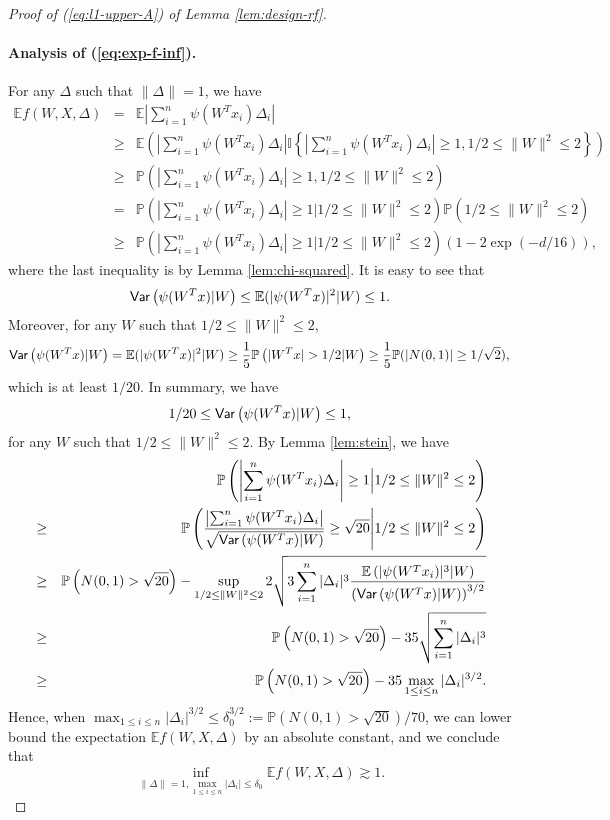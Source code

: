 \begin{proof}[Proof of (\ref{eq:l1-upper-A}) of Lemma \ref{lem:design-rf}]
\paragraph{Analysis of (\ref{eq:exp-f-inf}).} For any $\Delta$ such that $\|\Delta\|=1$, we have
\begin{eqnarray}
\nonumber \mathbb{E}f(W,X,\Delta) &=& \mathbb{E}\left|\sum_{i=1}^n\psi(W^Tx_i)\Delta_i\right| \\
\nonumber &\geq& \mathbb{E}\left(\left|\sum_{i=1}^n\psi(W^Tx_i)\Delta_i\right|\mathbb{I}\left\{\left|\sum_{i=1}^n\psi(W^Tx_i)\Delta_i\right|\geq 1, 1/2\leq \|W\|^2\leq 2\right\}\right) \\
\nonumber &\geq& \mathbb{P}\left(\left|\sum_{i=1}^n\psi(W^Tx_i)\Delta_i\right|\geq 1, 1/2\leq \|W\|^2\leq 2\right) \\
\nonumber &=& \mathbb{P}\left(\left|\sum_{i=1}^n\psi(W^Tx_i)\Delta_i\right|\geq 1\Big|1/2\leq \|W\|^2\leq 2\right)\mathbb{P}\left(1/2\leq \|W\|^2\leq 2\right) \\
\nonumber &\geq& \mathbb{P}\left(\left|\sum_{i=1}^n\psi(W^Tx_i)\Delta_i\right|\geq 1\Big|1/2\leq \|W\|^2\leq 2\right)\left(1-2\exp(-d/16)\right),
\end{eqnarray}
where the last inequality is by Lemma \ref{lem:chi-squared}. It is easy to see that $$\textsf{Var}\left(\psi(W^Tx)|W\right)\leq \mathbb{E}(|\psi(W^Tx)|^2|W)\leq 1.$$
Moreover, for any $W$ such that $1/2\leq \|W\|^2\leq 2$,
$$\Var\left(\psi(W^Tx)|W\right)= \mathbb{E}(|\psi(W^Tx)|^2|W) \geq \frac{1}{5}\mathbb{P}\left(|W^Tx|>1/2|W\right)\geq \frac{1}{5}\mathbb{P}(|N(0,1)|\geq 1/\sqrt{2}),$$
which is at least $1/20$. In summary, we have
$$1/20 \leq \textsf{Var}\left(\psi(W^Tx)|W\right) \leq 1,$$
for any $W$ such that $1/2\leq \|W\|^2\leq 2$.
By Lemma \ref{lem:stein}, we have
\begin{eqnarray}
\nonumber && \mathbb{P}\left(\left|\sum_{i=1}^n\psi(W^Tx_i)\Delta_i\right|\geq 1\Big|1/2\leq \|W\|^2\leq 2\right) \\
\nonumber &\geq& \mathbb{P}\left(\frac{\left|\sum_{i=1}^n\psi(W^Tx_i)\Delta_i\right|}{\sqrt{\Var\left(\psi(W^Tx)|W\right)}}\geq \sqrt{20}\Bigg|1/2\leq \|W\|^2\leq 2\right) \\
\nonumber &\geq& \mathbb{P}\left(N(0,1)>\sqrt{20}\right) - \sup_{1/2\leq \|W\|^2\leq 2} 2\sqrt{3\sum_{i=1}^n|\Delta_i|^3\frac{\mathbb{E}\left(|\psi(W^Tx_i)|^3|W\right)}{\left(\Var\left(\psi(W^Tx)|W\right)\right)^{3/2}}} \\
\nonumber &\geq& \mathbb{P}\left(N(0,1)>\sqrt{20}\right) - 35\sqrt{\sum_{i=1}^n|\Delta_i|^3} \\
\nonumber &\geq& \mathbb{P}\left(N(0,1)>\sqrt{20}\right) - 35\max_{1\leq i\leq n}|\Delta_i|^{3/2}.
\end{eqnarray}
Hence, when $\max_{1\leq i\leq n}|\Delta_i|^{3/2}\leq \delta_0^{3/2}:=\mathbb{P}\left(N(0,1)>\sqrt{20}\right)/70$, we can lower bound the expectation $\mathbb{E}f(W,X,\Delta)$ by an absolute constant, and we conclude that
\begin{equation}
\inf_{\|\Delta\|=1, \max_{1\leq i\leq n}|\Delta_i|\leq\delta_0}\mathbb{E}f(W,X,\Delta) \gtrsim 1.\label{appeq:l1-1-2}
\end{equation}


\end{proof}
